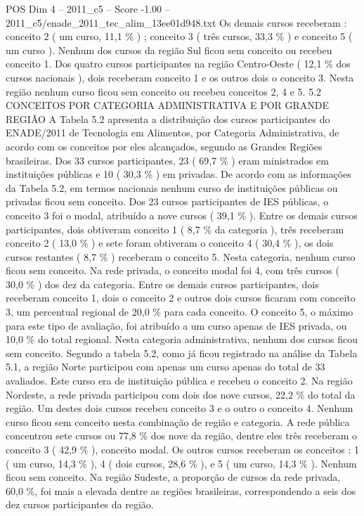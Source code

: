 \begin{textsample}{POS Dim 4 – 2011\_c5 – Score -1.00 – 2011\_c5/enade\_2011\_tec\_alim\_13ee01d948.txt}
Os demais cursos receberam : conceito 2 ( um curso, 11,1 \% ) ; conceito 3 ( três cursos, 33,3 \% ) e conceito 5 ( um curso ).
Nenhum dos cursos da região Sul ficou sem conceito ou recebeu conceito 1.
Dos quatro cursos participantes na região Centro-Oeste ( 12,1 \% dos cursos nacionais ), dois receberam conceito 1 e os outros dois o conceito 3.
Nesta região nenhum curso ficou sem conceito ou recebeu conceitos 2, 4 e 5. 5.2 CONCEITOS POR CATEGORIA ADMINISTRATIVA E POR GRANDE REGIÃO A Tabela 5.2 apresenta a distribuição dos cursos participantes do ENADE/2011 de Tecnologia em Alimentos, por Categoria Administrativa, de acordo com os conceitos por eles alcançados, segundo as Grandes Regiões brasileiras.
Dos 33 cursos participantes, 23 ( 69,7 \% ) eram ministrados em instituições públicas e 10 ( 30,3 \% ) em privadas.
De acordo com as informações da Tabela 5.2, em termos nacionais nenhum curso de instituições públicas ou privadas ficou sem conceito.
Dos 23 cursos participantes de IES públicas, o conceito 3 foi o modal, atribuído a nove cursos ( 39,1 \% ).
Entre os demais cursos participantes, dois obtiveram conceito 1 ( 8,7 \% da categoria ), três receberam conceito 2 ( 13,0 \% ) e sete foram obtiveram o conceito 4 ( 30,4 \% ), os dois cursos restantes ( 8,7 \% ) receberam o conceito 5.
Nesta categoria, nenhum curso ficou sem conceito.
Na rede privada, o conceito modal foi 4, com três cursos ( 30,0 \% ) dos dez da categoria.
Entre os demais cursos participantes, dois receberam conceito 1, dois o conceito 2 e outros dois cursos ficaram com conceito 3, um percentual regional de 20,0 \% para cada conceito.
O conceito 5, o máximo para este tipo de avaliação, foi atribuído a um curso apenas de IES privada, ou 10,0 \% do total regional.
Nesta categoria administrativa, nenhum dos cursos ficou sem conceito.
Segundo a tabela 5.2, como já ficou registrado na análise da Tabela 5.1, a região Norte participou com apenas um curso apenas do total de 33 avaliados.
Este curso era de instituição pública e recebeu o conceito 2.
Na região Nordeste, a rede privada participou com dois dos nove cursos, 22,2 \% do total da região.
Um destes dois cursos recebeu conceito 3 e o outro o conceito 4.
Nenhum curso ficou sem conceito nesta combinação de região e categoria.
A rede pública concentrou sete cursos ou 77,8 \% dos nove da região, dentre eles três receberam o conceito 3 ( 42,9 \% ), conceito modal.
Os outros cursos receberam os conceitos : 1 ( um curso, 14,3 \% ), 4 ( dois cursos, 28,6 \% ), e 5 ( um curso, 14,3 \% ).
Nenhum ficou sem conceito.
Na região Sudeste, a proporção de cursos da rede privada, 60,0 \%, foi mais a elevada dentre as regiões brasileiras, correspondendo a seis dos dez cursos participantes da região.

\end{textsample}
